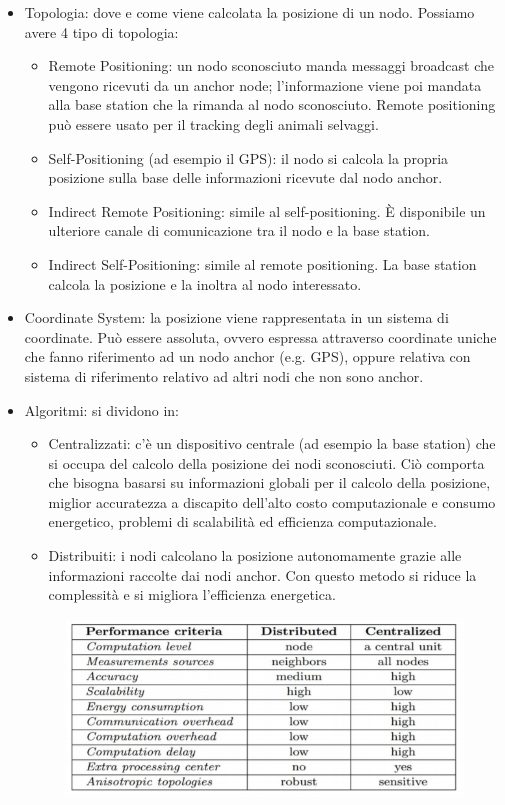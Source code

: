 \documentclass[12pt,a4paper]{article}
\begin{document}
	\begin{itemize}
		\item Topologia: dove e come viene calcolata la posizione di un nodo. Possiamo avere 4 tipo di topologia:
			\begin{itemize}
				\item Remote Positioning: un nodo sconosciuto manda messaggi broadcast che vengono ricevuti da un anchor node; l'informazione viene poi mandata alla base station che la rimanda al nodo sconosciuto. Remote positioning può essere usato per il tracking degli animali selvaggi.
				\item Self-Positioning (ad esempio il GPS): il nodo si calcola la propria posizione sulla base delle informazioni ricevute dal nodo anchor.
				\item Indirect Remote Positioning: simile al self-positioning. È disponibile un ulteriore canale di comunicazione tra il nodo e la base station.
				\item Indirect Self-Positioning: simile al remote positioning. La base station calcola la posizione e la inoltra al nodo interessato.
			\end{itemize}
		\item Coordinate System: la posizione viene rappresentata in un sistema di coordinate. Può essere assoluta, ovvero espressa attraverso coordinate uniche che fanno riferimento ad un nodo anchor (e.g. GPS), oppure relativa con sistema di riferimento relativo ad altri nodi che non sono anchor.
		\item Algoritmi: si dividono in:
		\begin{itemize}
			\item Centralizzati: c'è un dispositivo centrale (ad esempio la base station) che si occupa del calcolo della posizione dei nodi sconosciuti. Ciò comporta che bisogna basarsi su informazioni globali per il calcolo della posizione, miglior accuratezza a discapito dell'alto costo computazionale e consumo energetico, problemi di scalabilità ed efficienza computazionale.
			\item Distribuiti: i nodi calcolano la posizione autonomamente grazie alle informazioni raccolte dai nodi anchor. Con questo metodo si riduce la complessità e si migliora l'efficienza energetica.			
		\end{itemize}
		\begin{figure}
			\centering
			\includegraphics[scale=0.6]{fig2-lec3pt1.png}

\end{figure}
\end{itemize}
\end{document}
